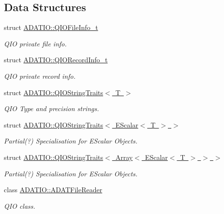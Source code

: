 \subsection*{Data Structures}
\begin{DoxyCompactItemize}
\item 
struct \mbox{\hyperlink{structADATIO_1_1QIOFileInfo__t}{A\+D\+A\+T\+I\+O\+::\+Q\+I\+O\+File\+Info\+\_\+t}}
\begin{DoxyCompactList}\small\item\em Q\+IO private file info. \end{DoxyCompactList}\item 
struct \mbox{\hyperlink{structADATIO_1_1QIORecordInfo__t}{A\+D\+A\+T\+I\+O\+::\+Q\+I\+O\+Record\+Info\+\_\+t}}
\begin{DoxyCompactList}\small\item\em Q\+IO private record info. \end{DoxyCompactList}\item 
struct \mbox{\hyperlink{structADATIO_1_1QIOStringTraits}{A\+D\+A\+T\+I\+O\+::\+Q\+I\+O\+String\+Traits$<$ T $>$}}
\begin{DoxyCompactList}\small\item\em Q\+IO Type and precision strings. \end{DoxyCompactList}\item 
struct \mbox{\hyperlink{structADATIO_1_1QIOStringTraits_3_01EScalar_3_01T_01_4_01_4}{A\+D\+A\+T\+I\+O\+::\+Q\+I\+O\+String\+Traits$<$ E\+Scalar$<$ T $>$ $>$}}
\begin{DoxyCompactList}\small\item\em Partial(?) Specialisation for E\+Scalar Objects. \end{DoxyCompactList}\item 
struct \mbox{\hyperlink{structADATIO_1_1QIOStringTraits_3_01Array_3_01EScalar_3_01T_01_4_01_4_01_4}{A\+D\+A\+T\+I\+O\+::\+Q\+I\+O\+String\+Traits$<$ Array$<$ E\+Scalar$<$ T $>$ $>$ $>$}}
\begin{DoxyCompactList}\small\item\em Partial(?) Specialisation for E\+Scalar Objects. \end{DoxyCompactList}\item 
class \mbox{\hyperlink{classADATIO_1_1ADATFileReader}{A\+D\+A\+T\+I\+O\+::\+A\+D\+A\+T\+File\+Reader}}
\begin{DoxyCompactList}\small\item\em Q\+IO class. \end{DoxyCompactList}\end{DoxyCompactItemize}
